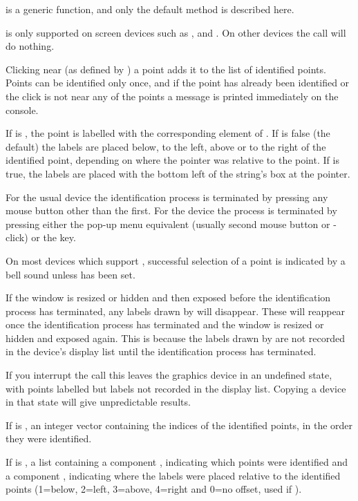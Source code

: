 \begin{Details}\relax
{} is a generic function, and only the default method is
described here.

 is only supported on screen devices such as
,  and .  On other devices the
call will do nothing.

Clicking near (as defined by ) a point adds it to the
list of identified points.  Points can be identified only once, and if
the point has already been identified or the click is not
near any of the points a message is printed immediately on
the \R{} console.

If  is , the point is labelled with the
corresponding element of .  If  is false (the
default) the labels are placed below, to the left, above or to the
right of the identified point, depending on where the pointer was
relative to the point.  If  is true, the
labels are placed with the bottom left of the string's box at the
pointer.

For the usual  device the identification process is
terminated by pressing any mouse button other than the first.
For the  device the process is terminated by
pressing either the pop-up menu equivalent (usually second mouse
button or -click) or the  key.

On most devices which support , successful selection of
a point is indicated by a bell sound unless
 has been set.

If the window is resized or hidden and then exposed before the identification
process has terminated, any labels drawn by 
will disappear.  These will reappear once the identification process has 
terminated and the window is resized or hidden and exposed again.
This is because the labels drawn by  are not
recorded in the device's display list until the identification process has
terminated.

If you interrupt the  call this leaves the graphics
device in an undefined state, with points labelled but labels not
recorded in the display list.  Copying a device in that state
will give unpredictable results.
\end{Details}
%
\begin{Value}
If  is , an integer vector containing the
indices of the identified points, in the order they were identified.

If  is , a list containing a component
, indicating which points were identified and a component
, indicating where the labels were placed relative to the
identified points (1=below, 2=left, 3=above, 4=right and 0=no offset,
used if ).
\end{Value}
